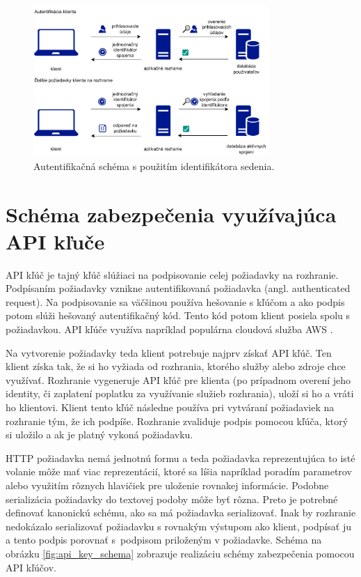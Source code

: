 \begin{figure}
    \centerline{\includegraphics[width=0.8\textwidth]{images/session_schema}}
    \caption[Schéma s použitím identifikátora sedenia]{Autentifikačná schéma s použitím identifikátora sedenia.}
    \label{obr:session}
\end{figure}

\section{Schéma zabezpečenia využívajúca API kľuče}

API kľúč je tajný kľúč slúžiaci na podpisovanie celej požiadavky na rozhranie. Podpísaním požiadavky vznikne autentifikovaná požiadavka (angl. authenticated request). Na podpisovanie sa väčšinou používa hešovanie s kľúčom a ako podpis potom slúži hešovaný autentifikačný kód. Tento kód potom klient posiela spolu s požiadavkou. API kľúče využíva napríklad populárna cloudová služba AWS \cite{aws_auth}.

Na vytvorenie požiadavky teda klient potrebuje najprv získať API kľúč. Ten klient získa tak, že si ho vyžiada od rozhrania, ktorého služby alebo zdroje chce využívať. Rozhranie vygeneruje API kľúč pre klienta (po prípadnom overení jeho identity, či zaplatení poplatku za využívanie služieb rozhrania), uloží si ho a vráti ho klientovi. Klient tento kľúč následne používa pri vytváraní požiadaviek na rozhranie tým, že ich podpíše. Rozhranie zvaliduje podpis pomocou kľúča, ktorý si uložilo a ak je platný vykoná požiadavku.

HTTP požiadavka nemá jednotnú formu a teda požiadavka reprezentujúca to isté volanie môže mať viac reprezentácií, ktoré sa líšia napríklad poradím parametrov alebo využitím rôznych hlavičiek pre uloženie rovnakej informácie. Podobne serializácia požiadavky do textovej podoby môže byť rôzna. Preto je potrebné definovať kanonickú schému, ako sa má požiadavka serializovať. Inak by rozhranie nedokázalo serializovať požiadavku s rovnakým výstupom ako klient, podpísať ju a tento podpis porovnať s~podpisom priloženým v požiadavke. Schéma na obrázku \ref{fig:api_key_schema} zobrazuje realizáciu schémy zabezpečenia pomocou API kľúčov.

